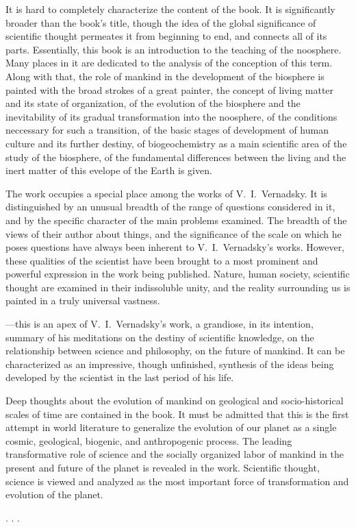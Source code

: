 It is hard to completely characterize the content of the book.  It is
significantly broader than the book's title, though the idea of the global
significance of scientific thought permeates it from beginning to end, and
connects all of its parts.  Essentially, this book is an introduction to the
teaching of the noosphere.  Many places in it are dedicated to the analysis of
the conception of this term.  Along with that, the role of mankind in the
development of the biosphere is painted with the broad strokes of a great
painter, the concept of living matter and its state of organization, of the
evolution of the biosphere and the inevitability of its gradual transformation
into the noosphere, of the conditions neccessary for such a transition, of the
basic stages of development of human culture and its further destiny, of
biogeochemistry as a main scientific area of the study of the biosphere, of the
fundamental differences between the living and the inert matter of this evelope
of the Earth is given.

The work  occupies a
special place among the works of V.~I.\ Vernadsky.  It is distinguished by an
unusual breadth of the range of questions considered in it, and by the specific
character of the main problems examined.  The breadth of the views of their
author about things, and the significance of the scale on which he poses
questions have always been inherent to V.~I.\ Vernadsky's works.  However,
these qualities of the scientist have been brought to a most prominent and
powerful expression in the work being published.  Nature, human society,
scientific thought are examined in their indissoluble unity, and the reality
surrounding us is painted in a truly universal vastness.

---this is an apex of
V.~I.\ Vernadsky's work, a grandiose, in its intention, summary of his
meditations on the destiny of scientific knowledge, on the relationship between
science and philosophy, on the future of mankind.  It can be characterized as
an impressive, though unfinished, synthesis of the ideas being developed by the
scientist in the last period of his life.

Deep thoughts about the evolution of mankind on geological and socio-historical
scales of time are contained in the book.  It must be admitted that this is the
first attempt in world literature to generalize the evolution of our planet as
a single cosmic, geological, biogenic, and anthropogenic process.  The leading
transformative role of science and the socially organized labor of mankind in
the present and future of the planet is revealed in the work.  Scientific
thought, science is viewed and analyzed as the most important force of
transformation and evolution of the planet.

. . .
